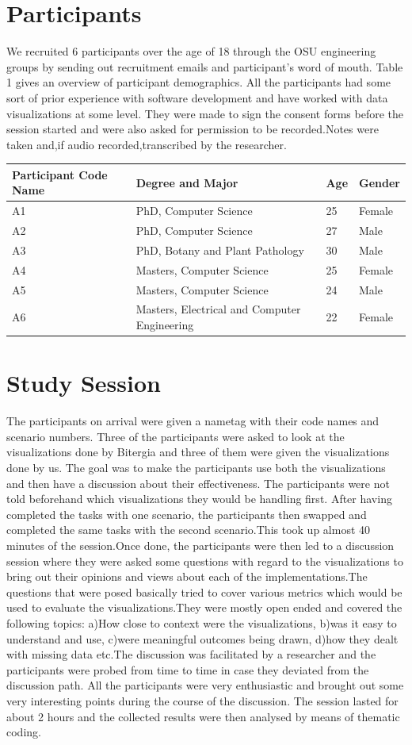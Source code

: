 \documentclass[double,12pt]{beavtex}
\begin{document}
\section{Participants}
We recruited 6 participants over the age of 18 through the OSU engineering groups by sending out recruitment emails and participant's word of mouth. Table 1 gives an overview of participant demographics. All the participants had some sort of prior experience with software development and have worked with data visualizations at some level. They were made to sign the consent forms before the session started and were also asked for permission to be recorded.Notes were taken and,if audio recorded,transcribed by the researcher.

\begin{tabular}{ |p{3cm}||p{5cm}|p{3cm}|p{3cm}|  }
 \hline
Participant Code Name & Degree and Major & Age & Gender\\
 \hline
 A1 & PhD, Computer Science & 25 & Female\\
 A2 & PhD, Computer Science & 27 & Male\\
 A3 & PhD, Botany and Plant Pathology & 30 & Male\\
 A4 & Masters, Computer Science & 25 & Female\\
 A5 & Masters, Computer Science & 24 & Male\\
 A6 & Masters, Electrical and Computer Engineering & 22 & Female\\
 \hline
\end{tabular}

\section{Study Session}
The participants on arrival were given a nametag with their code names and scenario numbers. Three of the participants were asked to look at the visualizations done by Bitergia and three of them were given the visualizations done by us. The goal was to make the participants use both the visualizations and then have a discussion about their effectiveness. The participants were not told beforehand which visualizations they would be handling first. After having completed the tasks with one scenario, the participants then swapped and completed the same tasks with the second scenario.This took up almost 40 minutes of the session.Once done, the participants were then led to a discussion session where they were asked some questions with regard to the visualizations to bring out their opinions and views about each of the implementations.The questions that were posed basically tried to cover various metrics which would be used to evaluate the visualizations.They were mostly open ended and covered the following topics: a)How close to context were the visualizations, b)was it easy to understand and use, c)were meaningful outcomes being drawn, d)how they dealt with missing data etc.The discussion was facilitated by a researcher and the participants were probed from time to time in case they deviated from the discussion path. All the participants were very enthusiastic and brought out some very interesting points during the course of the discussion. The session lasted for about 2 hours and the collected results were then analysed by means of thematic coding.
\end{document}
